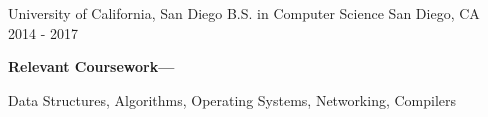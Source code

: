 

\begin{cventries}

  \cventry
    {University of California, San Diego} %
    {B.S. in Computer Science} %
    {San Diego, CA} %
    {2014 - 2017} %
    {
      \textbf{Relevant Coursework---}
      \vspace{5mm} 
       \begin{cvitems}
         \item Data Structures, Algorithms, Operating Systems, Networking, Compilers
       \end{cvitems}
    }

\end{cventries}
